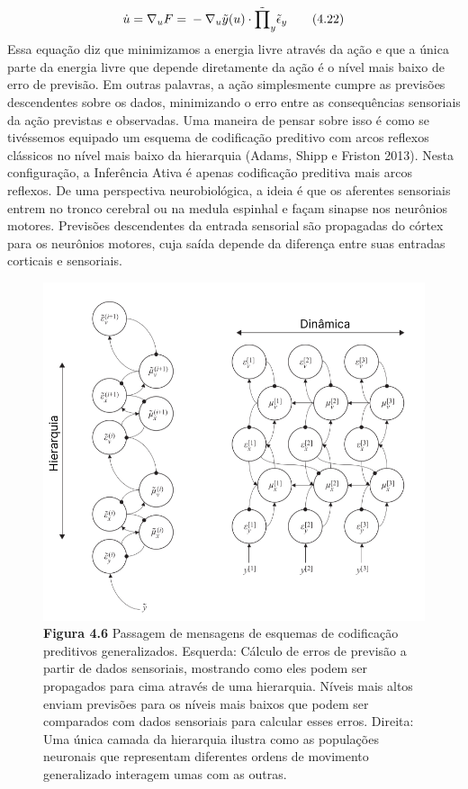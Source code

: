 \documentclass[
  12pt,
]{book}
\begin{document}
\[\begin{equation}\dot u = \nabla_uF = \\ -\nabla_u\tilde y(u) \cdot \tilde\prod_y \tilde\epsilon_y\end{equation} \qquad (4.22)\]
Essa equação diz que minimizamos a energia livre através da ação e que a única parte da energia livre que depende diretamente da ação é o nível mais baixo de erro de previsão. Em outras palavras, a ação simplesmente cumpre as previsões descendentes sobre os dados, minimizando o erro entre as consequências sensoriais da ação previstas e observadas. Uma maneira de pensar sobre isso é como se tivéssemos equipado um esquema de codificação preditivo com arcos reflexos clássicos no nível mais baixo da hierarquia (Adams, Shipp e Friston 2013). Nesta configuração, a Inferência Ativa é apenas codificação preditiva mais arcos reflexos. De uma perspectiva neurobiológica, a ideia é que os aferentes sensoriais entrem no tronco cerebral ou na medula espinhal e façam sinapse nos neurônios motores. Previsões descendentes da entrada sensorial são propagadas do córtex para os neurônios motores, cuja saída depende da diferença entre suas entradas corticais e sensoriais.

\begin{figure}
\centering
\includegraphics{images/Figura_4_6.png}
\caption{\textbf{Figura 4.6} Passagem de mensagens de esquemas de codificação preditivos generalizados. Esquerda: Cálculo de erros de previsão a partir de dados sensoriais, mostrando como eles podem ser propagados para cima através de uma hierarquia. Níveis mais altos enviam previsões para os níveis mais baixos que podem ser comparados com dados sensoriais para calcular esses erros. Direita: Uma única camada da hierarquia ilustra como as populações neuronais que representam diferentes ordens de movimento generalizado interagem umas com as outras.}
\end{figure}
\end{document}
